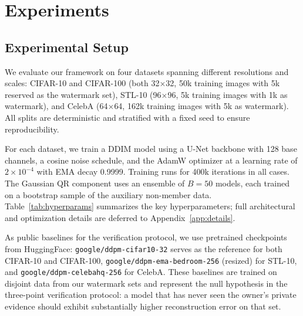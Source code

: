 \documentclass{article}
\begin{document}
\section{Experiments}
\label{sec:experiments}

\subsection{Experimental Setup}
\label{sec:setup}

We evaluate our framework on four datasets spanning different resolutions and scales: CIFAR-10 and CIFAR-100 (both 32$\times$32, 50k training images with 5k reserved as the watermark set), STL-10 (96$\times$96, 5k training images with 1k as watermark), and CelebA (64$\times$64, 162k training images with 5k as watermark). All splits are deterministic and stratified with a fixed seed to ensure reproducibility.

For each dataset, we train a DDIM model using a U-Net backbone with 128 base channels, a cosine noise schedule, and the AdamW optimizer at a learning rate of $2\times10^{-4}$ with EMA decay 0.9999. Training runs for 400k iterations in all cases. The Gaussian QR component uses an ensemble of $B{=}50$ models, each trained on a bootstrap sample of the auxiliary non-member data. Table~\ref{tab:hyperparams} summarizes the key hyperparameters; full architectural and optimization details are deferred to Appendix~\ref{app:details}.

As public baselines for the verification protocol, we use pretrained checkpoints from HuggingFace: \texttt{google/ddpm-cifar10-32} serves as the reference for both CIFAR-10 and CIFAR-100, \texttt{google/ddpm-ema-bedroom-256} (resized) for STL-10, and \texttt{google/ddpm-celebahq-256} for CelebA. These baselines are trained on disjoint data from our watermark sets and represent the null hypothesis in the three-point verification protocol: a model that has never seen the owner's private evidence should exhibit substantially higher reconstruction error on that set.
\end{document}
